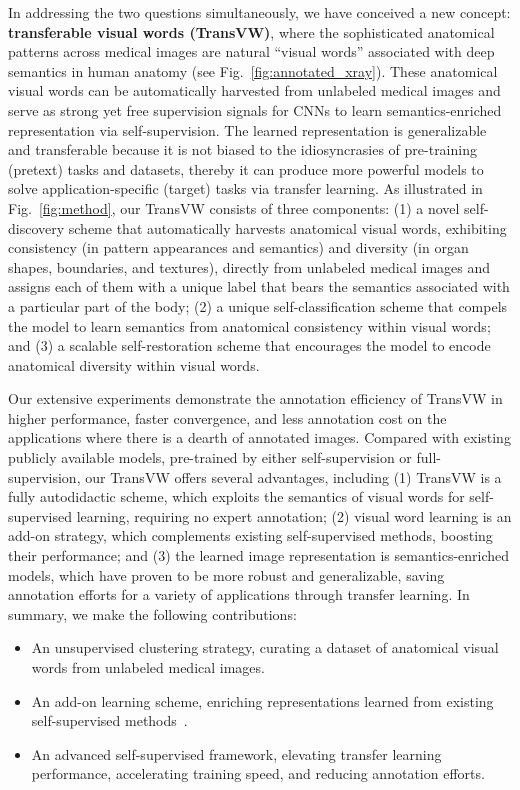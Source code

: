 \documentclass[journal,twoside,web]{ieeecolor}
\def\figurename{Fig.}
\begin{document}
In addressing the two questions simultaneously, we have conceived a new concept: \textbf{transferable visual words (TransVW)}, where the sophisticated anatomical patterns across medical images are natural ``visual words'' associated with deep semantics in human anatomy (see \figurename~\ref{fig:annotated_xray}). These anatomical visual words can be automatically harvested from unlabeled medical images and serve as strong yet free supervision signals for CNNs to learn semantics-enriched representation via self-supervision. The learned representation is generalizable and transferable because it is not biased to the idiosyncrasies of pre-training (pretext) tasks and datasets, thereby it can produce more powerful models to solve application-specific  (target) tasks via transfer learning. As illustrated in \figurename~\ref{fig:method}, our TransVW consists of three components: 
(1) a novel self-discovery scheme that automatically harvests anatomical visual words, exhibiting consistency (in pattern appearances  and  semantics) and diversity (in organ shapes, boundaries, and textures), directly from unlabeled medical images and assigns each of them with a unique label that bears the semantics associated with a particular part of the body;  (2) a unique self-classification scheme that compels the model to learn semantics from anatomical consistency within visual words; and (3) a scalable self-restoration scheme that encourages the model to encode anatomical diversity within visual words.


Our extensive experiments demonstrate the annotation efficiency of TransVW in higher performance, faster convergence, and less annotation cost on the applications where there is a dearth of annotated images. 
Compared with existing publicly available models,  pre-trained by either self-supervision or full-supervision, our TransVW offers several advantages, including (1) TransVW is a fully autodidactic scheme, which exploits the semantics of visual words for self-supervised learning, requiring no expert annotation; (2) visual word learning is an add-on strategy, which complements existing self-supervised methods, boosting their performance; and (3) the learned image representation is semantics-enriched models, which have proven to be more robust and generalizable, saving annotation efforts for a variety of applications through transfer learning. In summary, we make the following contributions:
\begin{itemize}
    \item An unsupervised clustering strategy, curating a dataset of anatomical visual words from unlabeled medical images.
    \item An add-on learning scheme, enriching representations learned from existing self-supervised methods~\cite{gidaris2018unsupervised,pathak2016context,chen2019self,zhou2019models}.
    \item An advanced self-supervised framework, elevating transfer learning performance, accelerating training speed, and reducing annotation efforts.
\end{itemize}
\end{document}
